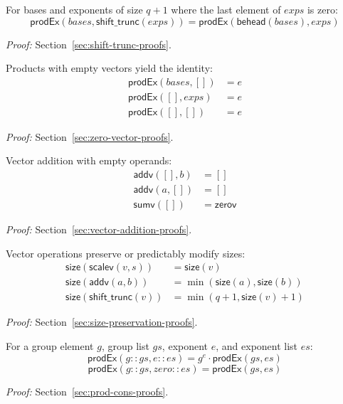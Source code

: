 \begin{lemma}
\label{lem:prodex-shift-trunc}
For bases and exponents of size $q+1$ where the last element of $exps$ is zero:
\[
\mathsf{prodEx}(bases, \mathsf{shift\_trunc}(exps)) = \mathsf{prodEx}(\mathsf{behead}(bases), exps)
\]
\end{lemma}
\noindent \textit{Proof:}  Section~\ref{sec:shift-trunc-proofs}.

\begin{lemma}
\label{lem:prodex-nil}
Products with empty vectors yield the identity:
\begin{align}
\mathsf{prodEx}(bases, []) &= e \\
\mathsf{prodEx}([], exps) &= e \\
\mathsf{prodEx}([], []) &= e
\end{align}
\end{lemma}
\noindent \textit{Proof:}  Section~\ref{sec:zero-vector-proofs}.

\begin{lemma}
\label{lem:addv-nil}
Vector addition with empty operands:
\begin{align}
\mathsf{addv}([], b) &= [] \\
\mathsf{addv}(a, []) &= [] \\
\mathsf{sumv}([]) &= \mathsf{zerov}
\end{align}
\end{lemma}
\noindent \textit{Proof:} Section~\ref{sec:vector-addition-proofs}.

\begin{lemma}
\label{lem:size-preservation}
Vector operations preserve or predictably modify sizes:
\begin{align}
\mathsf{size}(\mathsf{scalev}(v, s)) &= \mathsf{size}(v) \\
\mathsf{size}(\mathsf{addv}(a, b)) &= \min(\mathsf{size}(a), \mathsf{size}(b)) \\
\mathsf{size}(\mathsf{shift\_trunc}(v)) &= \min(q+1, \mathsf{size}(v) + 1)
\end{align}
\end{lemma}
\noindent \textit{Proof:} Section~\ref{sec:size-preservation-proofs}.

\begin{lemma}
\label{lem:prodex-cons}
For a group element $g$, group list $gs$, exponent $e$, and exponent list $es$:
\[
\mathsf{prodEx}(g :: gs, e :: es) = g^e \cdot \mathsf{prodEx}(gs, es)
\]
\[
\mathsf{prodEx}(g :: gs, zero :: es) =  \mathsf{prodEx}(gs, es)
\]
\end{lemma}
\noindent \textit{Proof:} Section~\ref{sec:prod-cons-proofs}.

